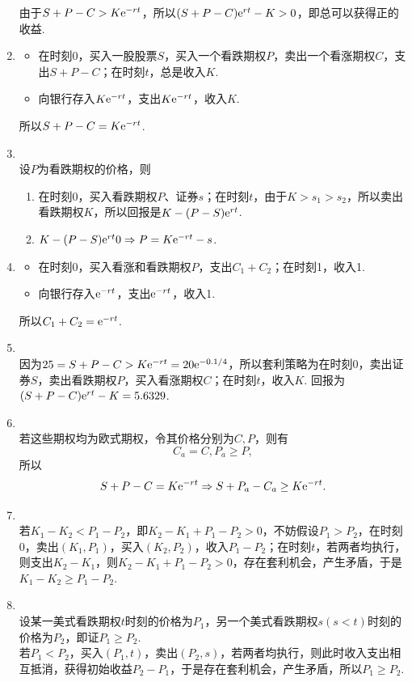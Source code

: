 \begin{enumerate}[label=\arabic{section}.\arabic*]
    由于$S+P-C>K\mathrm{e}^{-rt}$，所以$(S+P-C)\mathrm{e}^{rt}-K>0$，即总可以获得正的收益.
    \item \pro
    \begin{itemize}
        \item 在时刻0，买入一股股票$S$，买入一个看跌期权$P$，卖出一个看涨期权$C$，支出$S+P-C$；在时刻$t$，总是收入$K$.
        \item 向银行存入$K\mathrm{e}^{-rt}$，支出$K\mathrm{e}^{-rt}$，收入$K$.
    \end{itemize}
    所以$S+P-C=K\mathrm{e}^{-rt}$.
    \item \sol\\
    设$P$为看跌期权的价格，则
    \begin{enumerate}[label=\alph*)]
        \item 在时刻0，买入看跌期权$P$、证券$s$；在时刻$t$，由于$K>s_1>s_2$，所以卖出看跌期权$K$，所以回报是$K-(P-S)\mathrm{e}^{rt}$.
        \item $K-(P-S)\mathrm{e}^{rt} 0 \Rightarrow P = K\mathrm{e}^{-rt} - s$.
    \end{enumerate}
    \item \sol
    \begin{itemize}
        \item 在时刻0，买入看涨和看跌期权$P$，支出$C_1+C_2$；在时刻1，收入1.
        \item 向银行存入$\mathrm{e}^{-rt}$，支出$\mathrm{e}^{-rt}$，收入1.
    \end{itemize}
    所以$C_1+C_2=\mathrm{e}^{-rt}$.
    \item \sol\\
    因为$25=S+P-C > K\mathrm{e}^{-rt}=20\mathrm{e}^{-0.1/4}$，所以套利策略为在时刻0，卖出证券$S$，卖出看跌期权$P$，买入看涨期权$C$；在时刻$t$，收入$K$. 回报为$(S+P-C)\mathrm{e}^{rt}-K=5.6329$.
    \item \sol\\
    若这些期权均为欧式期权，令其价格分别为$C,P$，则有\[C_a = C, P_a \geq P,\]
    所以\[S+P-C=K\mathrm{e}^{-rt} \Rightarrow S+P_a-C_a \geq K\mathrm{e}^{-rt}.\]
    \item \pro\\
    若$K_1-K_2 < P_1-P_2$，即$K_2-K_1+P_1-P_2>0$，不妨假设$P_1 > P_2$，在时刻0，卖出$(K_1,P_1)$，买入$(K_2,P_2)$，收入$P_1-P_2$；在时刻$t$，若两者均执行，则支出$K_2-K_1$，则$K_2-K_1+P_1-P_2>0$，存在套利机会，产生矛盾，于是$K_1-K_2 \geq P_1-P_2$.
    \item \sol\\
    设某一美式看跌期权$t$时刻的价格为$P_1$，另一个美式看跌期权$s(s<t)$时刻的价格为$P_2$，即证$P_1 \geq P_2$.\\
    若$P_1 < P_2$，买入$(P_1,t)$，卖出$(P_2,s)$，若两者均执行，则此时收入支出相互抵消，获得初始收益$P_2-P_1$，于是存在套利机会，产生矛盾，所以$P_1 \geq P_2$.

\end{enumerate}
